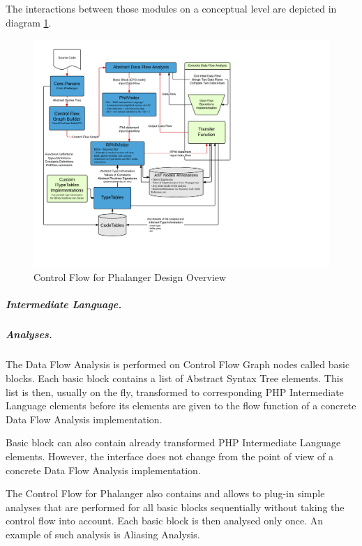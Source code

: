     The interactions between those modules on a conceptual level 
    are depicted in diagram \ref{overalldiagram}. 
    
\begin{figure}[h]  
  \centering
    \includegraphics*[width=\textwidth,height=\textheight,keepaspectratio,viewport=0 55 532 590]{img/ControlFlowModules.pdf}  
    \caption{Control Flow for Phalanger Design Overview\label{overalldiagram}}
\end{figure}    

    \subparagraph*{Intermediate Language.}
    
    
    \subparagraph*{Analyses.}
    The Data Flow Analysis is performed on Control Flow Graph 
    nodes called basic blocks. Each basic block contains 
    a list of Abstract Syntax Tree elements. This list is 
    then, usually on the fly, transformed to corresponding PHP 
    Intermediate Language elements before its elements are given 
    to the flow function of a concrete Data Flow Analysis 
    implementation. 
    
    Basic block can also contain already transformed PHP 
    Intermediate Language elements. However, the interface 
    does not change from the point of view of a concrete 
    Data Flow Analysis implementation.
    
    The Control Flow for Phalanger also contains and allows to 
    plug-in simple analyses that are performed for all 
    basic blocks sequentially without taking the control 
    flow into account. Each basic block is then analysed 
    only once. An example of such analysis is Aliasing Analysis.
    
